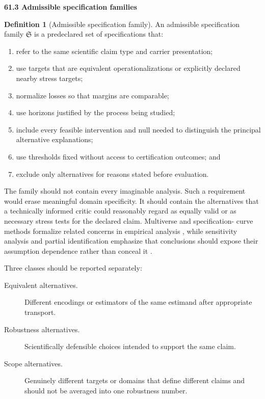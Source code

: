 \documentclass[11pt,letterpaper]{article}
\newcommand{\subtopic}[1]{%
 \vspace{0.45em}
 {\bfseries\color{AccentColor} #1\par}
}
\theoremstyle{plain}
\theoremstyle{definition}
\newtheorem{definition}[theorem]{Definition}
\begin{document}
\subtopic{61.3 Admissible specification families}

\begin{definition}[Admissible specification family]
\label{def:admissible-spec-family}
An admissible specification family \(\mathfrak S\) is a predeclared set of
specifications that:
\begin{enumerate}
\item refer to the same scientific claim type and carrier presentation;
\item use targets that are equivalent operationalizations or explicitly
 declared nearby stress targets;
\item normalize losses so that margins are comparable;
\item use horizons justified by the process being studied;
\item include every feasible intervention and null needed to distinguish the
 principal alternative explanations;
\item use thresholds fixed without access to certification outcomes; and
\item exclude only alternatives for reasons stated before evaluation.
\end{enumerate}
\end{definition}

The family should not contain every imaginable analysis. Such a requirement
would erase meaningful domain specificity. It should contain the alternatives
that a technically informed critic could reasonably regard as equally valid or
as necessary stress tests for the declared claim. Multiverse and specification-
curve methods formalize related concerns in empirical analysis
\cite{SteegenEtAl2016,SimonsohnEtAl2020}, while sensitivity analysis and
partial identification emphasize that conclusions should expose their
assumption dependence rather than conceal it \cite{Leamer1983,Manski2003}.

Three classes should be reported separately:
\begin{description}
\item[Equivalent alternatives.] Different encodings or estimators of the same
 estimand after appropriate transport.
\item[Robustness alternatives.] Scientifically defensible choices intended to
 support the same claim.
\item[Scope alternatives.] Genuinely different targets or domains that define
 different claims and should not be averaged into one robustness number.
\end{description}
\end{document}
